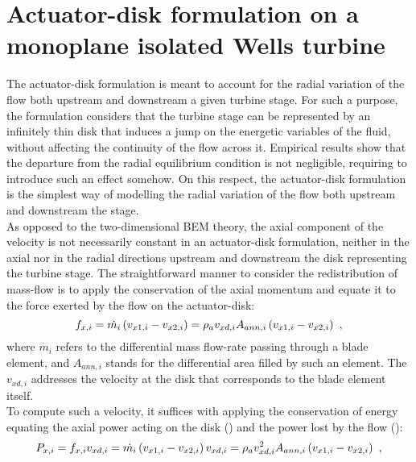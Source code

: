 
\section*{Actuator-disk formulation on a monoplane isolated Wells turbine}{\label{sec:actuator-disk_formulation_monoplane_isolated_Wells_turbine}}
\noindent The actuator-disk formulation is meant to account for the radial variation of the flow both upstream and downstream a given turbine stage. For such a purpose, the formulation considers that the turbine stage can be represented by an infinitely thin disk that induces a jump on the energetic variables of the fluid, without affecting the continuity of the flow across it. Empirical results show that the departure from the radial equilibrium condition is not negligible, requiring to introduce such an effect somehow. On this respect, the actuator-disk formulation is the simplest way of modelling the radial variation of the flow both upstream and downstream the stage.\\
As opposed to the two-dimensional BEM theory, the axial component of the velocity is not necessarily constant in an actuator-disk formulation, neither in the axial nor in the radial directions upstream and downstream the disk representing the turbine stage. The straightforward manner to consider the redistribution of mass-flow is to apply the conservation of the axial momentum and equate it to the force exerted by the flow on the actuator-disk:
\begin{equation}{\label{eq:axial_momentum_conservation_disk}}
	f_{x,i}=\dot{m_{i}}\left(v_{x1,i}-v_{x2,i}\right)=\rho_{a}v_{xd,i}A_{ann,i}\left(v_{x1,i}-v_{x2,i}\right) \ ,
\end{equation}
where $\dot{m_{i}}$ refers to the differential mass flow-rate passing through a blade element, and $A_{ann,i}$ stands for the differential area filled by such an element. The $v_{xd,i}$ addresses the velocity at the disk that corresponds to the blade element itself.\\
To compute such a velocity, it suffices with applying the conservation of energy equating the axial power acting on the disk () and the power lost by the flow ():
\begin{equation}{\label{eq:energy_conservation_axial_power}}
	P_{x,i}=f_{x,i}v_{xd,i}=\dot{m_{i}}\left(v_{x1,i}-v_{x2,i}\right)v_{xd,i}=\rho_{a}v_{xd,i}^{2}A_{ann,i}\left(v_{x1,i}-v_{x2,i}\right) \ ,
\end{equation}

